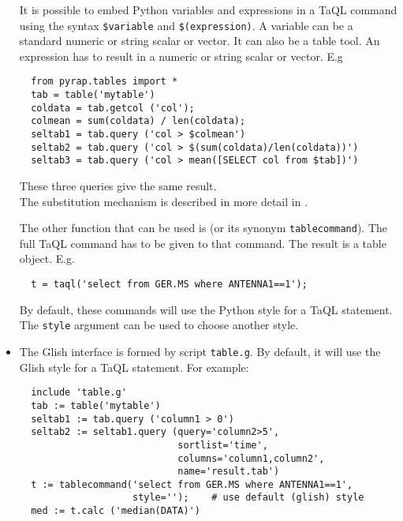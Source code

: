 \begin{itemize}
  It is possible to embed Python variables and expressions in a TaQL
  command using the syntax \texttt{\$variable} and
  \texttt{\$(expression)}. A variable can be a standard numeric or
  string scalar or vector. It can also be a table tool.
  An expression has to result in a numeric or string scalar or vector.
  E.g
\begin{verbatim}
  from pyrap.tables import *
  tab = table('mytable')
  coldata = tab.getcol ('col');
  colmean = sum(coldata) / len(coldata);
  seltab1 = tab.query ('col > $colmean')
  seltab2 = tab.query ('col > $(sum(coldata)/len(coldata))')
  seltab3 = tab.query ('col > mean([SELECT col from $tab])')
\end{verbatim}
  These three queries give the same result.
  \\The substitution mechanism is described in more detail in
  .

  The other function that can be used is
  (or its synonym \texttt{tablecommand}).
  The full TaQL command has to be given to that command. The result is
  a table object. E.g.
\begin{verbatim}
  t = taql('select from GER.MS where ANTENNA1==1');
\end{verbatim}  

  By default, these commands will use the Python style for a TaQL
  statement. The \texttt{style} argument can be used
  to choose another style.
\item
  The Glish interface is formed by script \texttt{table.g}.
  By default, it will use the Glish style for a TaQL
  statement.
  For example:
\begin{verbatim}
  include 'table.g'
  tab := table('mytable')
  seltab1 := tab.query ('column1 > 0')
  seltab2 := seltab1.query (query='column2>5',
                            sortlist='time',
                            columns='column1,column2',
                            name='result.tab')
  t := tablecommand('select from GER.MS where ANTENNA1==1',
                    style='');    # use default (glish) style
  med := t.calc ('median(DATA)')
\end{verbatim}


\end{itemize}
